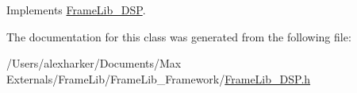 Implements \hyperlink{class_frame_lib___d_s_p}{Frame\+Lib\+\_\+\+D\+SP}.



The documentation for this class was generated from the following file\+:\begin{DoxyCompactItemize}
\item 
/\+Users/alexharker/\+Documents/\+Max Externals/\+Frame\+Lib/\+Frame\+Lib\+\_\+\+Framework/\hyperlink{_frame_lib___d_s_p_8h}{Frame\+Lib\+\_\+\+D\+S\+P.\+h}\end{DoxyCompactItemize}
